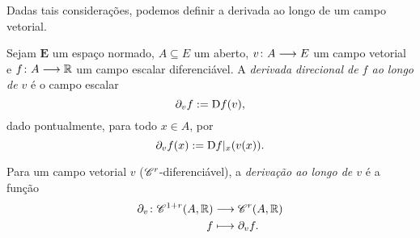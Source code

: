 Dadas tais considerações, podemos definir a derivada ao longo de um campo vetorial.

\begin{definition}
Sejam $\bm E$ um espaço normado, $A \subseteq E$ um aberto, $v\colon \allowbreak A \longrightarrow E$ um campo vetorial e $f\colon \allowbreak A \longrightarrow \mathbb{R}$ um campo escalar diferenciável. A \emph{derivada direcional de $f$ ao longo de $v$} é o campo escalar
	\begin{equation*}
	\partial_{v}f := \mathrm{D} f(v),
	\end{equation*}
dado pontualmente, para todo $x \in A$, por
	\begin{equation*}
	\partial_{v}f(x) := \mathrm{D} f|_x(v(x)).
	\end{equation*}

Para um campo vetorial $v$ ($\mathscr{C}^r$-diferenciável), a \emph{derivação ao longo de $v$} é a função
	\begin{align*}
	{\partial_{v}}\colon {\mathscr{C}^{1+r}(A,\mathbb{R})} &\longrightarrow {\mathscr{C}^r(A,\mathbb{R})} \\{f} &\longmapsto \partial_{v}f.
	\end{align*}
\end{definition}

